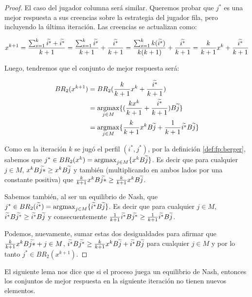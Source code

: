 \begin{proof}
    El caso del jugador columna será similar. Queremos probar que $j^*$ es una mejor respuesta a sus creencias sobre la estrategia del jugador fila, pero incluyendo la última iteración. Las creencias se actualizan como:

    \[
        x^{k+1} = \frac{\sum_{s=1}^{k}{\widetilde{i^s}} + \widetilde{i^*}}{k+1}
        = \frac{\sum_{s=1}^{k}{\widetilde{i^s}}}{k+1} + \frac{\widetilde{i^*}}{k+1}
        = \frac{\sum_{s=1}^{k}{k(\widetilde{i^s}})}{k(k+1)} + \frac{\widetilde{i^*}}{k+1}
        = \frac{k}{k+1} x^{k} + \frac{\widetilde{i^*}}{k+1}
    \]


    Luego, tendremos que el conjunto de mejor respuesta será:
    
    \begin{align*}
        BR_2(x^{k+1}) &= BR_2(\frac{k}{k+1} x^{k} + \frac{\widetilde{i^*}}{k+1}) \\
        &= \operatorname*{argmax}_{j \in M} \{(\frac{kx^{k}}{k+1} + \frac{\widetilde{i^*}}{k+1})B\widetilde{j}\}\\
        &= \operatorname*{argmax}_{j \in M} \{\frac{k}{k+1}x^{k}B\widetilde{j} + \frac{1}{k+1}\widetilde{i^*}B\widetilde{j}\}
    \end{align*}

    Como en la iteración $k$ se jugó el perfil $(i^*, j^*)$, por la definición \ref{def:fp:berger}, sabemos que $j^* \in BR_2(x^{k}) = \operatorname*{argmax}_{j \in M}\{x^{k}B\widetilde{j}\}$. Es decir que para cualquier $j \in M$, $x^{k}B\widetilde{j*} \geq x^{k}B\widetilde{j}$ y también (multiplicando en ambos lados por una constante positiva) que $\frac{k}{k+1}x^{k}B\widetilde{j*} \geq \frac{k}{k+1}x^{k}B\widetilde{j}$.

    Sabemos también, al ser un equilibrio de Nash, que $j^* \in BR_2(\widetilde{i^*}) = \operatorname*{argmax}_{j \in M}\{\widetilde{i^*}B\widetilde{j}\}$. Es decir que para cualquier $j \in M$, $\widetilde{i^*}B\widetilde{j^*} \geq \widetilde{i^*}B\widetilde{j}$ y consecuentemente $\frac{1}{k+1}\widetilde{i^*}B\widetilde{j^*} \geq \frac{1}{k+1}\widetilde{i^*}B\widetilde{j}$.

    Podemos, nuevamente, sumar estas dos desigualdades para afirmar que $\frac{k}{k+1}x^{k}B\widetilde{j*} + j \in M$, $\widetilde{i^*}B\widetilde{j^*} \geq \frac{k}{k+1}x^{k}B\widetilde{j} + \widetilde{i^*}B\widetilde{j}$ para cualquier $j \in M$ y por lo tanto $j^* \in BR_2(x^{k+1})$.
    
\end{proof}

El siguiente lema nos dice que si el proceso juega un equilibrio de Nash, entonces los conjuntos de mejor respuesta en la siguiente iteración no tienen nuevos elementos.

